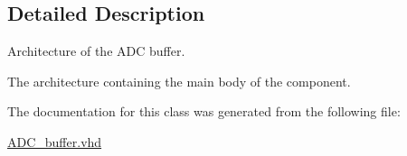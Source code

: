 \subsection{Detailed Description}
Architecture of the A\-D\-C buffer. 

The architecture containing the main body of the component. 

The documentation for this class was generated from the following file\-:\begin{DoxyCompactItemize}
\item 
\hyperlink{ADC__buffer_8vhd}{A\-D\-C\-\_\-buffer.\-vhd}\end{DoxyCompactItemize}
